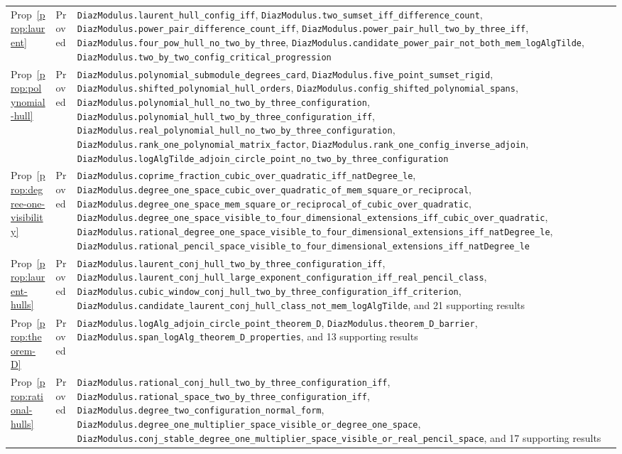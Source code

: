 \documentclass[11pt,a4paper]{article}
\theoremstyle{plain}
\theoremstyle{definition}
\begin{document}
\begin{center}
\begin{longtable}{@{}llp{6.2cm}@{}}
Prop~\ref{prop:laurent} & Proved & \nolinkurl{DiazModulus.laurent_hull_config_iff}, \nolinkurl{DiazModulus.two_sumset_iff_difference_count}, \nolinkurl{DiazModulus.power_pair_difference_count_iff}, \nolinkurl{DiazModulus.power_pair_hull_two_by_three_iff}, \nolinkurl{DiazModulus.four_pow_hull_no_two_by_three}, \nolinkurl{DiazModulus.candidate_power_pair_not_both_mem_logAlgTilde}, \nolinkurl{DiazModulus.two_by_two_config_critical_progression} \\
Prop~\ref{prop:polynomial-hull} & Proved & \nolinkurl{DiazModulus.polynomial_submodule_degrees_card}, \nolinkurl{DiazModulus.five_point_sumset_rigid}, \nolinkurl{DiazModulus.shifted_polynomial_hull_orders}, \nolinkurl{DiazModulus.config_shifted_polynomial_spans}, \nolinkurl{DiazModulus.polynomial_hull_no_two_by_three_configuration}, \nolinkurl{DiazModulus.polynomial_hull_two_by_three_configuration_iff}, \nolinkurl{DiazModulus.real_polynomial_hull_no_two_by_three_configuration}, \nolinkurl{DiazModulus.rank_one_polynomial_matrix_factor}, \nolinkurl{DiazModulus.rank_one_config_inverse_adjoin}, \nolinkurl{DiazModulus.logAlgTilde_adjoin_circle_point_no_two_by_three_configuration} \\
Prop~\ref{prop:degree-one-visibility} & Proved & \nolinkurl{DiazModulus.coprime_fraction_cubic_over_quadratic_iff_natDegree_le}, \nolinkurl{DiazModulus.degree_one_space_cubic_over_quadratic_of_mem_square_or_reciprocal}, \nolinkurl{DiazModulus.degree_one_space_mem_square_or_reciprocal_of_cubic_over_quadratic}, \nolinkurl{DiazModulus.degree_one_space_visible_to_four_dimensional_extensions_iff_cubic_over_quadratic}, \nolinkurl{DiazModulus.rational_degree_one_space_visible_to_four_dimensional_extensions_iff_natDegree_le}, \nolinkurl{DiazModulus.rational_pencil_space_visible_to_four_dimensional_extensions_iff_natDegree_le} \\
Prop~\ref{prop:laurent-hulls} & Proved & \nolinkurl{DiazModulus.laurent_conj_hull_two_by_three_configuration_iff}, \nolinkurl{DiazModulus.laurent_conj_hull_large_exponent_configuration_iff_real_pencil_class}, \nolinkurl{DiazModulus.cubic_window_conj_hull_two_by_three_configuration_iff_criterion}, \nolinkurl{DiazModulus.candidate_laurent_conj_hull_class_not_mem_logAlgTilde}, and 21 supporting results \\
Prop~\ref{prop:theorem-D} & Proved & \nolinkurl{DiazModulus.logAlg_adjoin_circle_point_theorem_D}, \nolinkurl{DiazModulus.theorem_D_barrier}, \nolinkurl{DiazModulus.span_logAlg_theorem_D_properties}, and 13 supporting results \\
Prop~\ref{prop:rational-hulls} & Proved & \nolinkurl{DiazModulus.rational_conj_hull_two_by_three_configuration_iff}, \nolinkurl{DiazModulus.rational_space_two_by_three_configuration_iff}, \nolinkurl{DiazModulus.degree_two_configuration_normal_form}, \nolinkurl{DiazModulus.degree_one_multiplier_space_visible_or_degree_one_space}, \nolinkurl{DiazModulus.conj_stable_degree_one_multiplier_space_visible_or_real_pencil_space}, and 17 supporting results \\

\end{longtable}
\end{center}
\end{document}
